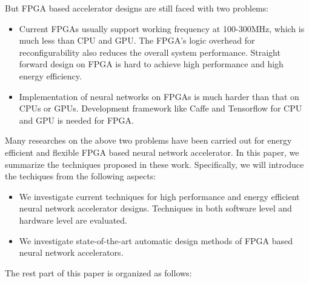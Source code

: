 But FPGA based accelerator designs are still faced with two problems:
\begin{itemize}
    \item Current FPGAs usually support working frequency at 100-300MHz, which is much less than CPU and GPU. The FPGA's logic overhead for reconfigurability also reduces the overall system performance. Straight forward design on FPGA is hard to achieve high performance and high energy efficiency.
    \item Implementation of neural networks on FPGAs is much harder than that on CPUs or GPUs. Development framework like Caffe and Tensorflow for CPU and GPU is needed for FPGA.
\end{itemize}
 
Many researches on the above two problems have been carried out for energy efficient and flexible FPGA based neural network accelerator. In this paper, we summarize the techniques proposed in these work. Specifically, we will introduce the techiques from the following aspects:
\begin{itemize}
    \item We investigate current techniques for high performance and energy efficient neural network accelerator designs. Techniques in both software level and hardware level are evaluated.
    \item We investigate state-of-the-art automatic design methods of FPGA based neural network accelerators. 
\end{itemize}

The rest part of this paper is organized as follows: